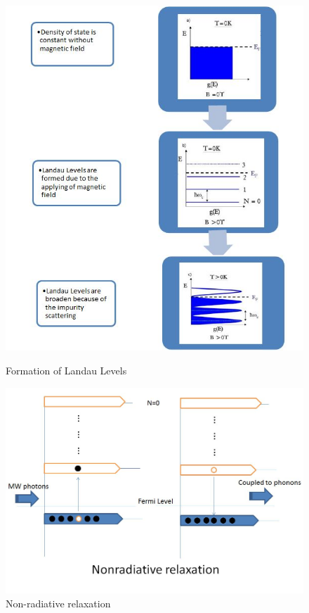 \documentclass[12pt]{ruthesis}
\begin{document}
\begin{figure}[!htb]\centering
   \begin{minipage}{0.49\textwidth}
     \includegraphics[width=\linewidth]{figures/llformation.JPG}
     \caption{Formation of Landau Levels}\label{llformation}
   \end{minipage}
   \begin {minipage}{0.49\textwidth}
     \includegraphics[width=\linewidth]{figures/nonradiative.JPG}
     \caption{Non-radiative relaxation}\label{nonradiative}
   \end{minipage}
\end{figure}
\end{document}
